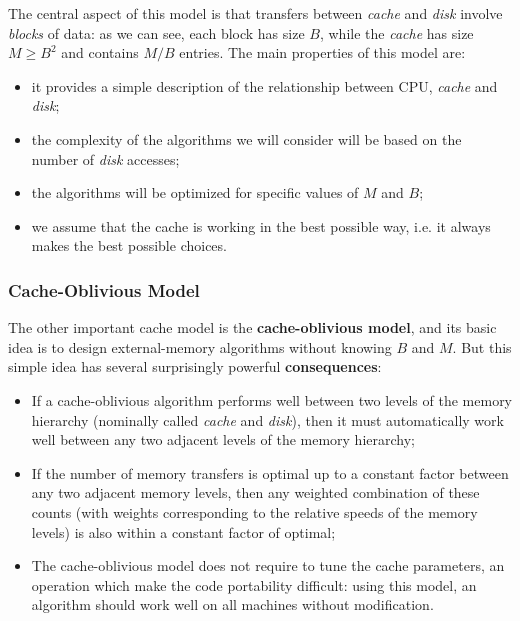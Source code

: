 The central aspect of this model is that transfers between \textit{cache} and \textit{disk} involve \textit{blocks} of data: as we can see, each block has size $B$, while the \textit{cache} has size $M \geq B^2$ and contains $M/B$ entries. The main properties of this model are:

\begin{itemize}

    \item it provides a simple description of the relationship between CPU, \textit{cache} and \textit{disk};

    \item the complexity of the algorithms we will consider will be based on the number of \textit{disk} accesses;

    \item the algorithms will be optimized for specific values of $M$ and $B$;

    \item we assume that the cache is working in the best possible way, i.e. it always makes the best possible choices.
    
\end{itemize}

\subsubsection{Cache-Oblivious Model}
The other important cache model is the \textbf{cache-oblivious model}, and its basic idea is to design external-memory algorithms without knowing $B$ and $M$. But this simple idea has several surprisingly powerful \textbf{consequences}:

\begin{itemize}
    \item If a cache-oblivious algorithm performs well between two levels of the memory hierarchy (nominally called \textit{cache} and \textit{disk}), then it must automatically work well between any two adjacent levels of the memory hierarchy;
    \item If the number of memory transfers is optimal up to a constant factor between any two adjacent memory levels, then any weighted combination of these counts (with weights corresponding to the relative speeds of the memory levels) is also within a constant factor of optimal;
    \item The cache-oblivious model does not require to tune the cache parameters, an operation which make the code portability difficult: using this model, an algorithm should work well on all machines without modification.
\end{itemize}

